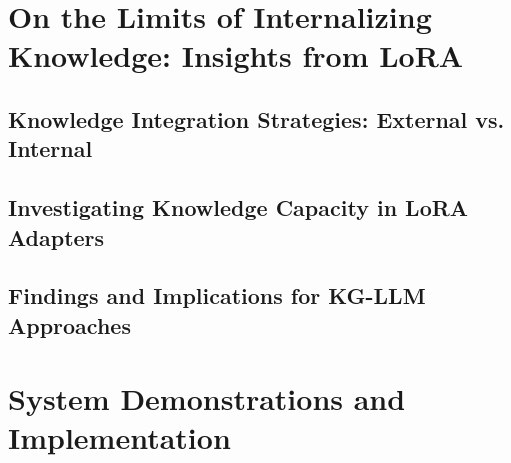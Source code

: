 \chapter{On the Limits of Internalizing Knowledge: Insights from LoRA}
\label{chap:lora_limits}


\section{Knowledge Integration Strategies: External vs. Internal}
\label{sec:lora_external_vs_internal}


\section{Investigating Knowledge Capacity in LoRA Adapters}
\label{sec:lora_capacity_investigation}


\section{Findings and Implications for KG-LLM Approaches}
\label{sec:lora_implications}

\chapter{System Demonstrations and Implementation}
\label{chap:system_demos}

